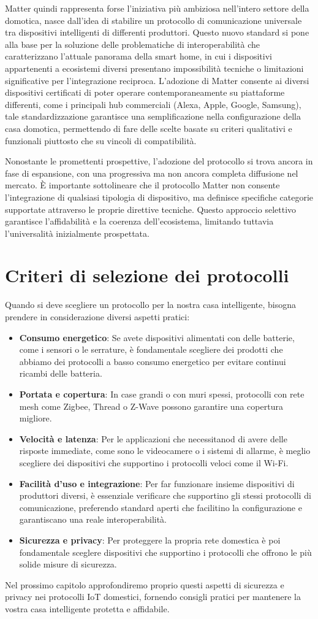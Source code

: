 Matter quindi rappresenta forse l'iniziativa più ambiziosa nell'intero settore della domotica, nasce dall'idea di stabilire un protocollo di comunicazione universale tra dispositivi intelligenti di differenti produttori. Questo nuovo standard si pone alla base per la soluzione delle problematiche di interoperabilità che caratterizzano l'attuale panorama della smart home, in cui i dispositivi appartenenti a ecosistemi diversi presentano impossibilità tecniche o limitazioni significative per l'integrazione reciproca. L'adozione di Matter consente ai diversi dispositivi certificati di poter operare contemporaneamente su piattaforme differenti, come i principali hub commerciali (Alexa, Apple, Google, Samsung), tale standardizzazione garantisce una semplificazione nella configurazione della casa domotica, permettendo di fare delle scelte basate su criteri qualitativi e funzionali piuttosto che su vincoli di compatibilità.

Nonostante le promettenti prospettive, l'adozione del protocollo si trova ancora in fase di espansione, con una progressiva ma non ancora completa diffusione nel mercato. È importante sottolineare che il protocollo Matter non consente l'integrazione di qualsiasi tipologia di dispositivo, ma definisce specifiche categorie supportate attraverso le proprie direttive tecniche. Questo approccio selettivo garantisce l'affidabilità e la coerenza dell'ecosistema, limitando tuttavia l'universalità inizialmente prospettata.

\section{Criteri di selezione dei protocolli}
Quando si deve scegliere un protocollo per la nostra casa intelligente, bisogna prendere in considerazione diversi aspetti pratici:
\begin{itemize}
    \item \textbf{Consumo energetico}: Se avete dispositivi alimentati con delle batterie, come i sensori o le serrature, è fondamentale scegliere dei prodotti che abbiamo dei protocolli a basso consumo energetico  per evitare continui ricambi delle batteria.
    \item \textbf{Portata e copertura}: In case grandi o con muri spessi, protocolli con rete mesh come Zigbee, Thread o Z-Wave possono garantire una copertura migliore.
    \item \textbf{Velocità e latenza}: Per le applicazioni che necessitanod di avere delle risposte immediate, come sono le videocamere o i sistemi di allarme, è meglio scegliere dei dispositivi che supportino i protocolli veloci come il Wi-Fi.
    \item \textbf{Facilità d'uso e integrazione}: Per far funzionare insieme dispositivi di produttori diversi, è essenziale verificare che supportino gli stessi protocolli di comunicazione, preferendo standard aperti che facilitino la configurazione e garantiscano una reale interoperabilità.
    \item \textbf{Sicurezza e privacy}: Per proteggere la propria rete domestica è poi fondamentale sceglere dispositivi che supportino i protocolli che offrono le più solide misure di sicurezza.
\end{itemize}

Nel prossimo capitolo approfondiremo proprio questi aspetti di sicurezza e privacy nei protocolli IoT domestici, fornendo consigli pratici per mantenere la vostra casa intelligente protetta e affidabile.